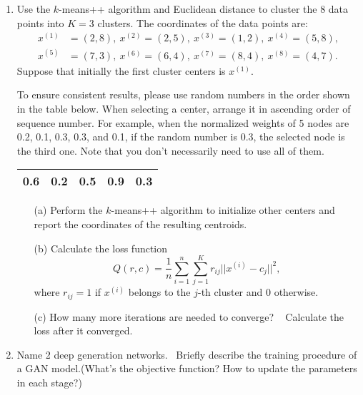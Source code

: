 \documentclass[10pt]{article}
\begin{document}
\begin{enumerate}[1.]
	\item {} Use the $k$-means++ algorithm and Euclidean distance to cluster the 8 data points into $K=3$ clusters.
	      The coordinates of the data points are:
	      \begin{align*}
		      x^{(1)} & = (2,8),  \ x^{(2)} = (2,5), \ x^{(3)} = (1,2), \ x^{(4)} = (5,8), \\
		      x^{(5)} & = (7,3),  \ x^{(6)} = (6,4), \ x^{(7)} = (8,4), \ x^{(8)} = (4,7).
	      \end{align*}
	      Suppose that initially the first cluster centers is $x^{(1)}$. \\
	      {\color{blue} To ensure consistent results, please use random numbers in the order shown in the table below. When selecting a center, arrange it in ascending order of sequence number. For example, when the normalized weights of 5 nodes are 0.2, 0.1, 0.3, 0.3, and 0.1, if the random number is 0.3, the selected node is the third one. Note that you don't necessarily need to use all of them.\\
	      \begin{tabular}{|c|c|c|c|c|}
	      	\hline
	      	0.6 & 0.2 & 0.5 & 0.9 & 0.3 \\
	      	\hline
	      \end{tabular}
	      }
	      \begin{itemize}
		      \item[(a)] Perform the $k$-means++ algorithm to initialize other centers and report the coordinates of the resulting centroids. ~
		      \item[(b)] Calculate the loss function
		            \begin{equation}
			            Q(r,c) = \frac{1}{n} \sum_{i=1}^n \sum_{j=1}^K r_{ij}||x^{(i)} - c_j||^2,
		            \end{equation}
		            where $r_{ij} = 1$ if $x^{(i)}$ belongs to the $j$-th cluster and 0 otherwise. ~
		      \item[(c)] How many more iterations are needed to converge? ~ Calculate the loss after it converged.~
	      \end{itemize} \newpage


	\item {} Name 2 deep generation networks.~ Briefly describe the training procedure of a GAN model.(What's the objective function? How to update the parameters in each stage?)~\\

\end{enumerate}
\end{document}
